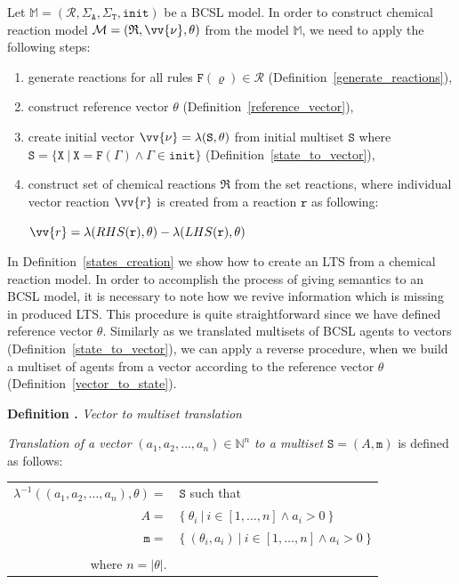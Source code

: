 \documentclass[12pt]{fithesis2}
\newcounter{counter}[section]
\renewcommand{\thecounter}{\thesection.\arabic{counter}}
\newenvironment{definition}[1]{\bigskip\refstepcounter{counter}\noindent\textbf{Definition \thecounter } \emph{#1} \par\nopagebreak \begin{itshape}}{\end{itshape}\bigskip}
\begin{document}
Let $\mathds{M} = (\mathcal{R}, \Sigma_\mathtt{A}, \Sigma_\mathtt{T}, \mathtt{init})$ be a BCSL model. In order to construct chemical reaction model $\mathcal{M} = (\mathfrak{R}, \vv{\nu}, \theta)$ from the model $\mathds{M}$, we need to apply the following steps:

\begin{enumerate}
\item generate reactions for all rules $\mathtt{F}(\varrho) \in \mathcal{R}$ (Definition~\ref{generate_reactions}),
\item construct reference vector $\theta$ (Definition~\ref{reference_vector}),
\item create initial vector $\vv{\nu} = \lambda(\mathtt{S}, \theta)$ from initial multiset $\mathtt{S}$ where $\mathtt{S} = \{ \mathtt{X} ~|~ \mathtt{X} = \mathtt{F}(\Gamma) \wedge \Gamma \in \mathtt{init} \}$ (Definition~\ref{state_to_vector}),
\item construct set of chemical reactions $\mathfrak{R}$ from the set reactions, where individual vector reaction $\vv{r}$ is created from a reaction $\mathtt{r}$ as following:

\begin{center}
$\vv{r} = \lambda(RHS(\mathtt{r}), \theta) - \lambda(LHS(\mathtt{r}), \theta)$
\end{center}

\end{enumerate}

In Definition~\ref{states_creation} we show how to create an LTS from a chemical reaction model. In order to accomplish the process of giving semantics to an BCSL model, it is necessary to note how we revive information which is missing in produced LTS. This procedure is quite straightforward since we have defined reference vector $\theta$. Similarly as we translated multisets of BCSL agents to vectors (Definition~\ref{state_to_vector}), we can apply a reverse procedure, when we build a multiset of agents from a vector according to the reference vector $\theta$ (Definition~\ref{vector_to_state}).

\begin{definition}{Vector to multiset translation}
\label{vector_to_state}

\emph{Translation of a vector} $(a_1, a_2, \ldots, a_n) \in \mathbb{N}^n$ \emph{to a multiset} $\mathtt{S} = (A, \mathtt{m})$ is defined as follows:

\begin{center}
\begin{tabular}{r@{\hskip 0.05cm}l}
$\lambda^{-1}((a_1, a_2, \ldots, a_n), \theta) =$ & $ \mathtt{S}$ such that\\
$A = $ & $ \{~ \theta_i ~|~ i \in [1, \ldots, n] \wedge a_i > 0 ~\}$\\

$\mathtt{m} = $& $ \{~ (\theta_i, a_i) ~|~ i \in [1, \ldots, n] \wedge a_i > 0 ~\}$\\
& \\
where $n = |\theta|$. &\\
\end{tabular}
\end{center}
\end{definition}
\end{document}
